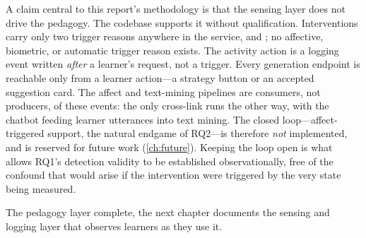 A claim central to this report's methodology is that the sensing layer
does not drive the pedagogy. The codebase supports it without
qualification. Interventions carry only two trigger reasons anywhere in
the service,  and ; no
affective, biometric, or automatic trigger reason exists. The
 activity action is a logging event written
\emph{after} a learner's request, not a trigger. Every generation
endpoint is reachable only from a learner action---a strategy button or an
accepted suggestion card. The affect and text-mining pipelines are
consumers, not producers, of these events: the only cross-link runs the
other way, with the chatbot feeding learner utterances into text mining.
The closed loop---affect-triggered support, the natural endgame of
RQ2---is therefore \emph{not} implemented, and is reserved for future
work (\cref{ch:future}). Keeping the loop open is what allows RQ1's
detection validity to be established observationally, free of the
confound that would arise if the intervention were triggered by the very
state being measured.

\medskip
\noindent The pedagogy layer complete, the next chapter documents the
sensing and logging layer that observes learners as they use it.
